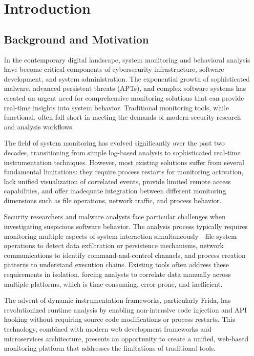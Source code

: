 \chapter{Introduction}

\section{Background and Motivation}

In the contemporary digital landscape, system monitoring and behavioral analysis have become critical components of cybersecurity infrastructure, software development, and system administration. The exponential growth of sophisticated malware, advanced persistent threats (APTs), and complex software systems has created an urgent need for comprehensive monitoring solutions that can provide real-time insights into system behavior. Traditional monitoring tools, while functional, often fall short in meeting the demands of modern security research and analysis workflows.

The field of system monitoring has evolved significantly over the past two decades, transitioning from simple log-based analysis to sophisticated real-time instrumentation techniques. However, most existing solutions suffer from several fundamental limitations: they require process restarts for monitoring activation, lack unified visualization of correlated events, provide limited remote access capabilities, and offer inadequate integration between different monitoring dimensions such as file operations, network traffic, and process behavior.

Security researchers and malware analysts face particular challenges when investigating suspicious software behavior. The analysis process typically requires monitoring multiple aspects of system interaction simultaneously—file system operations to detect data exfiltration or persistence mechanisms, network communications to identify command-and-control channels, and process creation patterns to understand execution chains. Existing tools often address these requirements in isolation, forcing analysts to correlate data manually across multiple platforms, which is time-consuming, error-prone, and inefficient.

The advent of dynamic instrumentation frameworks, particularly Frida, has revolutionized runtime analysis by enabling non-intrusive code injection and API hooking without requiring source code modifications or process restarts. This technology, combined with modern web development frameworks and microservices architecture, presents an opportunity to create a unified, web-based monitoring platform that addresses the limitations of traditional tools.

